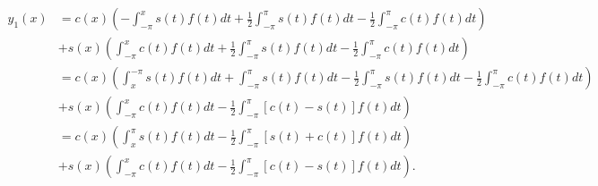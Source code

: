 \documentclass{article}
\begin{document}
\begin{align*}
y_1(x)&=c(x)\left(-\int_{-\pi}^x s(t)f(t)dt+\frac{1}{2}\int_{-\pi}^\pi s(t)f(t)dt-\frac{1}{2}\int_{-\pi}^\pi c(t)f(t)dt\right)\\&+s(x)\left(\int_{-\pi}^x c(t)f(t)dt+\frac{1}{2}\int_{-\pi}^\pi s(t)f(t)dt-\frac{1}{2}\int_{-\pi}^\pi c(t)f(t)dt\right)\\&=
c(x)\left(\int_x^{-\pi} s(t)f(t)dt+\int_{-\pi}^\pi s(t)f(t)dt-\frac{1}{2}\int_{-\pi}^\pi s(t)f(t)dt-\frac{1}{2}\int_{-\pi}^\pi c(t)f(t)dt\right)\\&+s(x)\left(\int_{-\pi}^x c(t)f(t)dt-\frac{1}{2} \int_{-\pi}^\pi [c(t) - s(t)] f(t) dt\right)\\&=
c(x) \left(\int_x^\pi s(t) f(t) d t  - \frac{1}{2} \int_{-\pi}^\pi [s(t) + c(t)] f(t) d t  \right) \\
    & + s(x) \left(\int_{-\pi}^x c(t) f(t) d t - \frac{1}{2} \int_{-\pi}^\pi [c(t) - s(t)] f(t) d t \right).
\end{align*}
\end{document}
